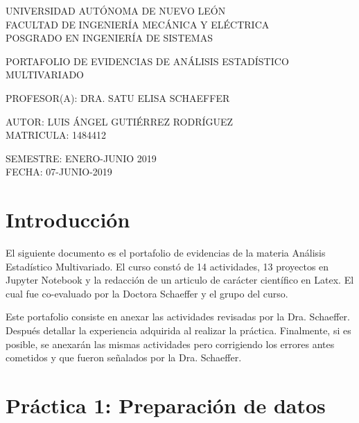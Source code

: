 \documentclass[12pt, letter]{report}
\begin{document}
	
\begin{titlepage}	
	\begin{center}
		\huge UNIVERSIDAD AUTÓNOMA DE NUEVO LEÓN\\
		\bigskip
		\bigskip
		FACULTAD DE INGENIERÍA MECÁNICA Y ELÉCTRICA\\
		\bigskip
		\bigskip
		POSGRADO EN INGENIERÍA DE SISTEMAS\\
		\bigskip
		\bigskip
		\bigskip
		\bigskip
		\begin{Large}
			PORTAFOLIO DE EVIDENCIAS DE ANÁLISIS ESTADÍSTICO MULTIVARIADO\\
		\end{Large}
		\bigskip
		\bigskip
		\begin{large}
		\bigskip
			PROFESOR(A): DRA. SATU ELISA SCHAEFFER\\
		\bigskip
		\end{large}
		\bigskip
		\bigskip
		\bigskip
		\begin{large}
			AUTOR: LUIS ÁNGEL GUTIÉRREZ RODRÍGUEZ\\
			MATRICULA: 1484412\\
		\end{large}
		\bigskip
		\bigskip		
		    \normalsize SEMESTRE: ENERO-JUNIO 2019\\
		    FECHA: 07-JUNIO-2019
	\end{center}	
\end{titlepage}	





\chapter*{Introducción}

El siguiente documento es el portafolio de evidencias de la materia Análisis Estadístico Multivariado. El curso constó de 14 actividades, 13 proyectos en Jupyter Notebook y la redacción de un articulo de carácter científico en Latex. El cual fue co-evaluado por la Doctora Schaeffer y el grupo del curso.

Este portafolio consiste en anexar las actividades revisadas por la Dra. Schaeffer. Después detallar la experiencia adquirida al realizar la práctica. Finalmente, si es posible, se anexarán las mismas actividades pero corrigiendo los errores antes cometidos y que fueron señalados por la Dra. Schaeffer.


\newpage

\chapter*{Práctica 1: Preparación de datos}

\end{document}
